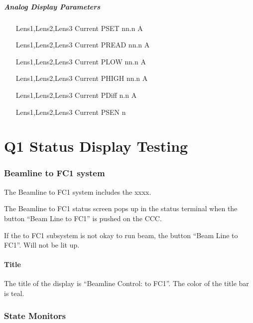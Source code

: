 \documentclass[11pt]{book}		%
\begin{document}
\paragraph{Analog Display Parameters}

\begin{enumerate}
 \item [Lens1,Lens2,Lens3] Current PSET   nn.n A
 \item [Lens1,Lens2,Lens3] Current PREAD  nn.n A
 \item [Lens1,Lens2,Lens3] Current PLOW   nn.n A
 \item [Lens1,Lens2,Lens3] Current PHIGH  nn.n A
 \item [Lens1,Lens2,Lens3] Current PDiff n.n A
 \item [Lens1,Lens2,Lens3] Current PSEN  n
\end{enumerate}




\chapter{Q1 Status Display Testing}


\subsection{Beamline to FC1 system} \label{sect:cyc-op-interface-status-terminal-display-contents-beamline-fc1}

The Beamline to FC1 system includes the xxxx.

The Beamline to FC1 status screen pops up in the status terminal when the button ``Beam Line to FC1'' is pushed on the CCC.

If the to FC1 subsystem is not okay to run beam, the button ``Beam Line to FC1''. Will not be lit up.


\subsubsection{Title}\label{sect:cyc-op-interface-status-terminal-display-contents-beamline-fc1-title}

The title of the display is ``Beamline Control: to FC1''.  The color of the title bar is teal.

\subsection{State Monitors} \label{sect:cyc-op-interface-status-beamline-tofc1-state-monitors}
\end{document}
